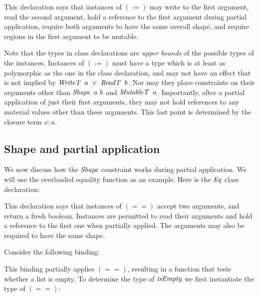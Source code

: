 This declaration says that instances of $(:=)$ may write to the first argument, read the second argument, hold a reference to the first argument during partial application, require both arguments to have the same overall shape, and require regions in the first argument to be mutable.

Note that the types in class declarations are \emph{upper bounds} of the possible types of the instances. Instances of $(:=)$ must have a type which is at least as polymorphic as the one in the class declaration, and may not have an effect that is not implied by $\operatorname{\mathit{WriteT}} \ a \ \lor \ \operatorname{\mathit{ReadT}} \ b$. Nor may they place constraints on their arguments other than $\operatorname{\mathit{Shape}} \ a \ b$ and $\operatorname{\mathit{MutableT}} \ a$. Importantly, after a partial application of just their first arguments, they may not hold references to any material values other than these arguments. This last point is determined by the closure term $x : a$.


\subsection{Shape and partial application}
\label{System:TypeClassing:shape-and-partial-application}

We now discuss how the $\operatorname{\mathit{Shape}}$ constraint works during partial application. We will use the overloaded equality function as an example. Here is the $\operatorname{\mathit{Eq}}$ class declaration:


This declaration says that instances of $(==)$ accept two arguments, and return a fresh boolean. Instances are permitted to read their arguments and hold a reference to the first one when partially applied. The arguments may also be required to have the same shape.

Consider the following binding:

\code{
	$\iisEmpty$	& $=$	& $(==)\  [\ ]$
}

This binding partially applies $(==)$, resulting in a function that tests whether a list is empty. To determine the type of $\iisEmpty$ we first instantiate the type of $(==)$:

